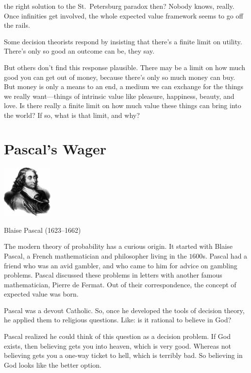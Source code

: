 \documentclass[justified]{tufte-book}
\theoremstyle{definition}
\theoremstyle{definition}
\theoremstyle{definition}
\theoremstyle{definition}
\theoremstyle{remark}
\begin{document}
 the right solution to the St.~Petersburg paradox then? Nobody knows, really. Once infinities get involved, the whole expected value framework seems to go off the rails.

Some decision theorists respond by insisting that there's a finite limit on utility. There's only so good an outcome can be, they say.

But others don't find this response plausible. There may be a limit on how much good you can get out of money, because there's only so much money can buy. But money is only a means to an end, a medium we can exchange for the things we really want---things of intrinsic value like pleasure, happiness, beauty, and love. Is there really a finite limit on how much value these things can bring into the world? If so, what is that limit, and why?

\hypertarget{pascals-wager}{%
\section{Pascal's Wager}\label{pascals-wager}}

\begin{marginfigure}
\includegraphics[width=1in]{img/pascal} \caption[Blaise Pascal (1623--1662)]{Blaise Pascal (1623--1662)}\label{fig:unnamed-chunk-117}
\end{marginfigure}

The modern theory of probability has a curious origin. It started with Blaise Pascal, a French mathematician and philosopher living in the \(1600\)s. Pascal had a friend who was an avid gambler, and who came to him for advice on gambling problems. Pascal discussed these problems in letters with another famous mathematician, Pierre de Fermat. Out of their correspondence, the concept of expected value was born.

Pascal was a devout Catholic. So, once he developed the tools of decision theory, he applied them to religious questions. Like: is it rational to believe in God?

Pascal realized he could think of this question as a decision problem. If God exists, then believing gets you into heaven, which is very good. Whereas not believing gets you a one-way ticket to hell, which is terribly bad. So believing in God looks like the better option.
\end{document}
